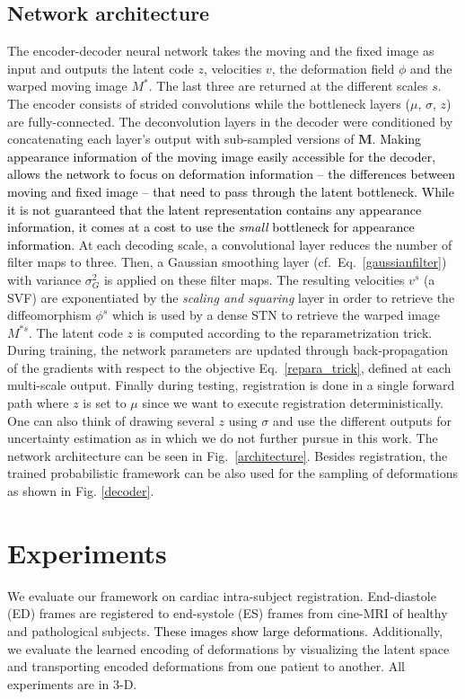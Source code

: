 \documentclass[journal]{IEEEtran}
\newcommand{\update}[1]{\textcolor{black}{#1}}
\begin{document}
\subsection{Network architecture}
The encoder-decoder neural network takes the moving and the fixed image as input and outputs the latent code $z$, velocities $v$, the deformation field $\phi$ and the warped moving image $M^*$. The last three are returned at the different scales $s$. The encoder consists of strided convolutions while the bottleneck layers ($\mu$, $\sigma$, $z$) are fully-connected. The deconvolution layers in the decoder were conditioned by concatenating each layer's output with sub-sampled versions of $\mathbf{M}$. \update{Making appearance information of the moving image easily accessible for the decoder, allows the network to focus on deformation information -- the differences between moving and fixed image -- that need to pass through the latent bottleneck. While it is not guaranteed that the latent representation contains any appearance information, it comes at a cost to use the \emph{small} bottleneck for appearance information.} At each decoding scale, a convolutional layer reduces the number of filter maps to three. Then, a Gaussian smoothing layer (cf.\ Eq.\ \ref{gaussianfilter}) with variance $\sigma_G^2$ is applied on these filter maps. The resulting velocities $v^s$ (a SVF) are exponentiated by the \emph{scaling and squaring} layer \cite{krebs2018unsupervised} in order to retrieve the diffeomorphism $\phi^s$ which is used by a dense STN to retrieve the warped image $M^{*s}$. The latent code $z$ is computed according to the reparametrization trick. During training, the network parameters are updated through back-propagation of the gradients with respect to the objective Eq.\ \ref{repara_trick}, defined at each multi-scale output. Finally during testing, registration is done in a single forward path where $z$ is set to $\mu$ since we want to execute registration deterministically. One can also think of drawing several $z$ using $\sigma$ and use the different outputs for uncertainty estimation as in \cite{dalca2018unsupervised} which we do not further pursue in this work. The network architecture can be seen in Fig.\ \ref{architecture}. Besides registration, the trained probabilistic framework can be also used for the sampling of deformations as shown in Fig. \ref{decoder}. 

\section{Experiments}
We evaluate our framework on cardiac intra-subject registration. End-diastole (ED) frames are registered to end-systole (ES) frames from cine-MRI of healthy and pathological subjects\update{. These images show large deformations.} Additionally, we evaluate the learned encoding of deformations by visualizing the latent space and transporting encoded deformations from one patient to another. All experiments are in 3-D. 
\end{document}
